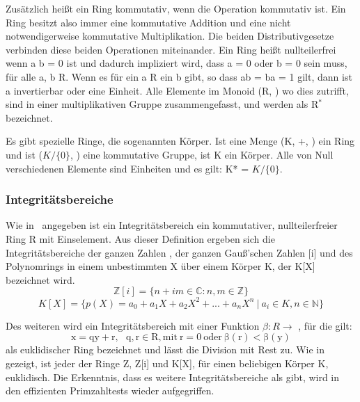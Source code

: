 			Zusätzlich heißt ein Ring kommutativ, wenn die Operation \mycdot kommutativ ist. Ein Ring besitzt also immer eine kommutative Addition und eine nicht notwendigerweise kommutative Multiplikation. Die beiden Distributivgesetze verbinden diese beiden Operationen miteinander. Ein Ring heißt nullteilerfrei wenn a \mycdot b = 0 ist und dadurch impliziert wird, dass a = 0 oder b = 0 sein muss, für alle a, b \myin R. Wenn es für ein a \myin R ein b gibt, so dass ab = ba = 1 gilt, dann ist a invertierbar oder eine Einheit. Alle Elemente im Monoid (R, \mycdotOhne) wo dies zutrifft, sind in einer multiplikativen Gruppe zusammengefasst, und werden als R$^*$ bezeichnet.~\cite{Erste:Hilfe:in:Linearer:Algebra}
			
			Es gibt spezielle Ringe, die sogenannten Körper. Ist eine Menge (K, +, \mycdotOhne) ein Ring und ist ($K / \{0\}$, \mycdotOhne) eine kommutative Gruppe, ist K ein Körper. Alle von Null verschiedenen Elemente sind Einheiten und es gilt: K* = $K / \{0\}$.~\cite{Erste:Hilfe:in:Linearer:Algebra}
			
		\subsubsection{Integritätsbereiche}
			Wie in~\cite{Algorithmische:Zahlentheorie} angegeben ist ein Integritätsbereich ein kommutativer, nullteilerfreier Ring R mit Einselement. Aus dieser Definition ergeben sich die Integritätsbereiche der ganzen Zahlen , der ganzen Gauß’schen Zahlen [i] und des Polynomrings in einem unbestimmten X über einem Körper K, der K[X] bezeichnet wird. 
			\begin{displaymath}
				\mathbb{Z}[i] = \{n + im  \in \mathbb{C} : n,m \in \mathbb{Z}\}
			\end{displaymath}
			\begin{displaymath}	
				K[X] = \{p(X)= a_0 + a_1X + a_2X^2 + . . . + a_nX^n~|~a_i \in K, n \in \mathbb{N}\}					
			\end{displaymath}

			Des weiteren wird ein Integritätsbereich mit einer Funktion  $\beta : R \longrightarrow$ , für die gilt: 
			\begin{displaymath}
				\mathrm{x = qy + r,~~~q, r \in R,	mit~r=0~oder~\beta(r) < \beta(y)}
			\end{displaymath}
			als euklidischer Ring bezeichnet und lässt die Division mit Rest zu. Wie in \cite{Algorithmische:Zahlentheorie} gezeigt, ist jeder der Ringe Z, Z[i] und K[X], für einen beliebigen Körper K, euklidisch. Die Erkenntnis, dass es weitere Integritätsbereiche als  gibt, wird in den effizienten Primzahltests wieder aufgegriffen. 
			
